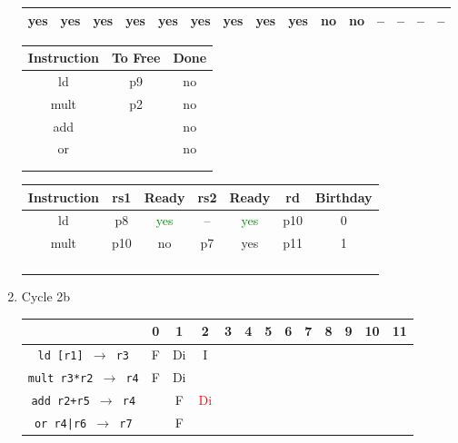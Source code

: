 \documentclass[12pt]{article}
\begin{document}
\begin{enumerate}
\begin{table}[H]
\begin{tabular}{|c|c|c|c|c|c|c|c|c|c|c|c|c|c|c|}
					\hline
					yes & yes & yes & yes & yes & yes & yes & yes & yes & no & no & -- & -- & -- & --\\
					\hline
				\end{tabular}
			\end{table}
			\begin{table}[H]
				\begin{tabular}{|c|c|c|}
					\hline
					Instruction & To Free & Done\\
					\hline
					ld & p9 & no\\
					\hline
					mult & p2 & no\\
					\hline
					add & & no\\
					\hline
					or & & no\\
					\hline
					 & & \\
					\hline
					 & & \\
					\hline
				\end{tabular}
				\hfill
				\begin{tabular}{|c|c|c|c|c|c|c|}
					\hline
					Instruction & rs1 & Ready & rs2 & Ready & rd & Birthday\\
					\hline
					ld & p8 & \textcolor{green}{yes} & -- & \textcolor{green}{yes} & p10 & 0\\
					\hline
					mult & p10 & no & p7 & yes & p11 & 1\\
					\hline
					 &  &  &  &  &  & \\
					\hline
					 &  &  &  &  &  & \\
					\hline
					 &  &  &  &  &  & \\
					\hline
					 &  &  &  &  &  & \\
					\hline
				\end{tabular}
			\end{table}
		\item
			Cycle 2b
			\begin{table}[H]
				\begin{tabular}{|c|c|c|c|c|c|c|c|c|c|c|c|c|}
					\hline
					 & 0 & 1 & 2 & 3 & 4 & 5 & 6 & 7 & 8 & 9 & 10 & 11\\
					\hline
					\texttt{ld [r1] $\rightarrow$ r3} & F & Di & I &  &  &  &  &  &  &  &  &\\
					\hline
					\texttt{mult r3*r2 $\rightarrow$ r4} & F & Di &  &  &  &  &  &  &  &  &  &\\
					\hline
					\texttt{add r2+r5 $\rightarrow$ r4} &  & F & \textcolor{red}{Di} &  &  &  &  &  &  &  &  &\\
					\hline
					\texttt{or r4|r6 $\rightarrow$ r7} &  & F &  &  &  &  &  &  &  &  &  &\\

\end{tabular}
\end{table}
\end{enumerate}
\end{document}
